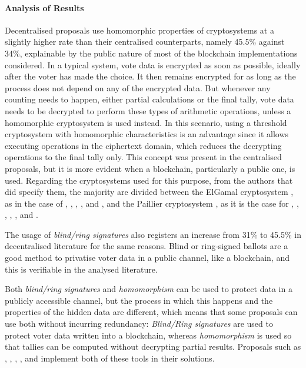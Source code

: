 \documentclass[../access.tex]{subfiles}
\begin{document}
\paragraph{Analysis of Results}
    Decentralised proposals use homomorphic properties of cryptosystems at a slightly higher rate than their centralised counterparts, namely 45.5\% against 34\%, explainable by the public nature of most of the blockchain implementations considered. In a typical system, vote data is encrypted as soon as possible, ideally after the voter has made the choice. It then remains encrypted for as long as the process does not depend on any of the encrypted data. But whenever any counting needs to happen, either partial calculations or the final tally, vote data needs to be decrypted to perform these types of arithmetic operations, unless a homomorphic cryptosystem is used instead. In this scenario, using a threshold cryptosystem with homomorphic characteristics is an advantage since it allows executing operations in the ciphertext domain, which reduces the decrypting operations to the final tally only. This concept was present in the centralised proposals, but it is more evident when a blockchain, particularly a public one, is used. Regarding the cryptosystems used for this purpose, from the authors that did specify them, the majority are divided between the ElGamal cryptosystem \cite{ElGamal1984}, as in the case of \cite{Matile2019}, \cite{Wang2018}, \cite{Chaieb2018}, \cite{Yang2020}, \cite{Killer2020} and \cite{Li2021}, and the Paillier cryptosystem \cite{OKeeffe2008}, as it is the case for \cite{Hsiao2018}, \cite{Zhang2018}, \cite{Dagher2018}, \cite{Chaieb2019}, \cite{Lopes2019}, \cite{Zhang2019a} and \cite{Zhang2020}.
	\par
    The usage of \textit{blind/ring signatures} also registers an increase from 31\% to 45.5\% in decentralised literature for the same reasons. Blind or ring-signed ballots are a good method to privatise voter data in a public channel, like a blockchain, and this is verifiable in the analysed literature.
    \par
    Both \textit{blind/ring signatures} and \textit{homomorphism} can be used to protect data in a publicly accessible channel, but the process in which this happens and the properties of the hidden data are different, which means that some proposals can use both without incurring redundancy: \textit{Blind/Ring signatures} are used to protect voter data written into a blockchain, whereas \textit{homomorphism} is used so that tallies can be computed without decrypting partial results. Proposals such as \cite{Shaheen2017}, \cite{Wang2018}, \cite{Chaieb2019}, \cite{Zhang2019a}, \cite{Yang2020} and \cite{Zhang2020} implement both of these tools in their solutions.
\end{document}
